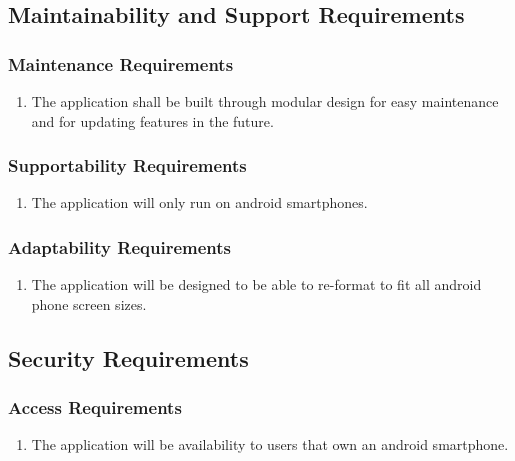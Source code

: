 \documentclass[12pt, titlepage]{article}
\begin{document}

\subsection{Maintainability and Support Requirements}
\label{sub:maintainability_and_support_requirements}

\subsubsection{Maintenance Requirements}
\label{ssub:maintenance_requirements}
\begin{enumerate}[{MS}1. ]
	\item The application shall be built through modular design for easy maintenance and for updating features in the future.
\end{enumerate}

\subsubsection{Supportability Requirements}
\label{ssub:supportability_requirements}
\begin{enumerate}[{MS}1. ]
	\item The application will only run on android smartphones.
\end{enumerate}

\subsubsection{Adaptability Requirements}
\label{ssub:adaptability_requirements}
\begin{enumerate}[{MS}1. ]
	\item The application will be designed to be able to re-format to fit all android phone screen sizes.
\end{enumerate}


\subsection{Security Requirements}
\label{sub:security_requirements}

\subsubsection{Access Requirements}
\label{ssub:access_requirements}
\begin{enumerate}[{SR}1. ]
	\item The application will be availability to users that own an android smartphone.
\end{enumerate}
\end{document}
